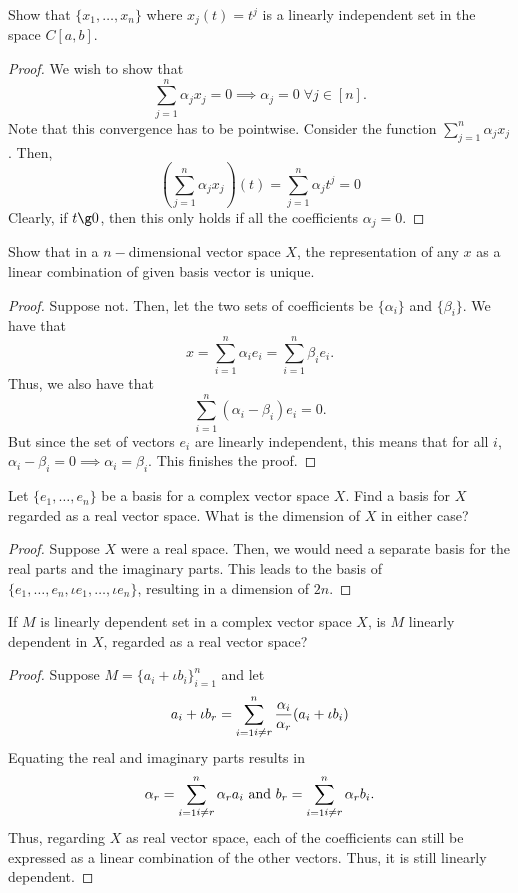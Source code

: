 \begin{question}
    Show that $\{x_1 , \ldots , x_n\}$ where $x_j(t) = t^j$ is a linearly independent set in the space $C[a,b]$.
    \label{section2.1-5}
\end{question}
\begin{proof}
    We wish to show that 
    \[\sum_{j=1}^n \alpha_j x_j = 0 \implies \alpha_j = 0 \; \forall j\in [n]. \]
    Note that this convergence has to be pointwise. Consider the function $\sum_{j=1}^n \alpha_j x_j$. Then,
    \[\left(\sum_{j=1}^n \alpha_j x_j \right)(t) = \sum_{j=1}^n \alpha_j t^j  = 0\]
    Clearly, if $t \g 0$, then this only holds if all the coefficients $\alpha_j = 0.$
\end{proof}

\begin{question}
    Show that in a $n-$dimensional vector space $X$, the representation of any $x$ as a linear combination of given basis vector is unique.
    \label{section2.1-6}
\end{question}
\begin{proof}
    Suppose not. Then, let the two sets of coefficients be $\{\alpha_i\}$ and $\{\beta_i\}$. We have that
    \[x = \sum_{i=1}^n \alpha_i e_i = \sum_{i=1}^n \beta_i e_i.\]
    Thus, we also have that
    \[\sum_{i=1}^n (\alpha_i - \beta_i) e_i = 0.\]
    But since the set of vectors $e_i$ are linearly independent, this means that for all $i$, $\alpha_i - \beta_i = 0 \implies \alpha_i  =\beta_i$. This finishes the proof.
\end{proof}

\begin{question}
    Let $\{e_1 , \ldots , e_n\}$ be a basis for a complex vector space $X$. Find a basis for $X$ regarded as a real vector space. What is the dimension of $X$ in either case?
    \label{section2.1-7}
\end{question}
\begin{proof}
    Suppose $X$ were a real space. Then, we would need a separate basis for the real parts and the imaginary parts. This leads to the basis of $\{e_1 , \ldots , e_n , \iota e_1 , \ldots , \iota e_n\}$, resulting in a dimension of $2n$.
\end{proof}

\begin{question}
    If $M$ is linearly dependent set in a complex vector space $X$, is $M$ linearly dependent in $X$, regarded as a real vector space?
    \label{section2.1-8}
\end{question}
\begin{proof}
    Suppose $M = \{a_i + \iota b_i\}_{i=1}^n$ and let 
    \[a_i + \iota b_r = \sum_{\substack{i=1}\\i\neq r}^n \frac{\alpha_i}{\alpha_r} (a_i + \iota b_i)\]
    Equating the real and imaginary parts results in 
    \[\alpha_r = \sum_{\substack{i=1}\\i\neq r}^n {\alpha_r} a_i \text{ and } b_r = \sum_{\substack{i=1}\\i\neq r}^n {\alpha_r} b_i.\]
    Thus, regarding $X$ as real vector space, each of the coefficients can still be expressed as a linear combination of the other vectors. Thus, it is still linearly dependent.
\end{proof}

